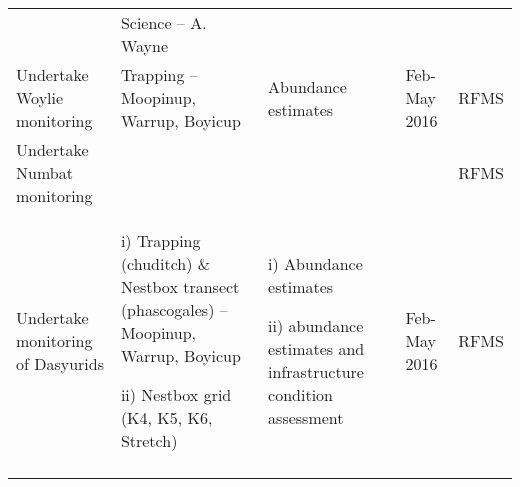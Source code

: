 \documentclass[version=last,
    paper=a4,                               %
    10pt,                                   %
    dvipsnames,
    oneside,                              %
    headings=openany,                       %
    open=any,
    BCOR=7mm,                               %
    DIV=15,     %
]{scrbook}
\begin{document}
\begin{longtable}[c]{@{}lllll@{}}
\begin{minipage}[t]{0.17\columnwidth}
~
\end{minipage} & \begin{minipage}[t]{0.17\columnwidth}\raggedright
Science -- A. Wayne
\end{minipage}
\\\addlinespace
\begin{minipage}[t]{0.17\columnwidth}\raggedright
Undertake Woylie monitoring
\end{minipage} & \begin{minipage}[t]{0.17\columnwidth}\raggedright
Trapping -- Moopinup, Warrup, Boyicup
\end{minipage} & \begin{minipage}[t]{0.17\columnwidth}\raggedright
Abundance estimates
\end{minipage} & \begin{minipage}[t]{0.17\columnwidth}\raggedright
Feb-May 2016
\end{minipage} & \begin{minipage}[t]{0.17\columnwidth}\raggedright
RFMS
\end{minipage}
\\\addlinespace
\begin{minipage}[t]{0.17\columnwidth}\raggedright
Undertake Numbat monitoring
\end{minipage} & \begin{minipage}[t]{0.17\columnwidth}\raggedright
~
\end{minipage} & \begin{minipage}[t]{0.17\columnwidth}\raggedright
~
\end{minipage} & \begin{minipage}[t]{0.17\columnwidth}\raggedright
~
\end{minipage} & \begin{minipage}[t]{0.17\columnwidth}\raggedright
RFMS
\end{minipage}
\\\addlinespace
\begin{minipage}[t]{0.17\columnwidth}\raggedright
Undertake monitoring of Dasyurids
\end{minipage} & \begin{minipage}[t]{0.17\columnwidth}\raggedright
i) Trapping (chuditch) \& Nestbox transect (phascogales) -- Moopinup,
Warrup, Boyicup

ii) Nestbox grid (K4, K5, K6, Stretch)
\end{minipage} & \begin{minipage}[t]{0.17\columnwidth}\raggedright
i) Abundance estimates

ii) abundance estimates and infrastructure condition assessment
\end{minipage} & \begin{minipage}[t]{0.17\columnwidth}\raggedright
Feb-May 2016
\end{minipage} & \begin{minipage}[t]{0.17\columnwidth}\raggedright
RFMS
\end{minipage}
\\\addlinespace
\bottomrule
\end{longtable}
\end{document}
